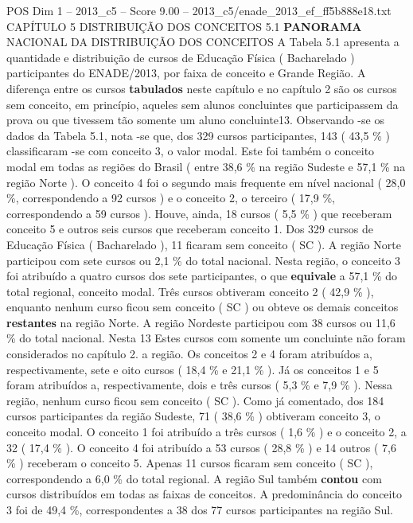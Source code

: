 \begin{textsample}{POS Dim 1 – 2013\_c5 – Score 9.00 – 2013\_c5/enade\_2013\_ef\_ff5b888e18.txt}  \label{ex:f1_pos_085}
CAPÍTULO 5 DISTRIBUIÇÃO DOS CONCEITOS 5.1 \textbf{PANORAMA} NACIONAL DA DISTRIBUIÇÃO DOS CONCEITOS A Tabela 5.1 apresenta a quantidade e distribuição de cursos de Educação Física ( Bacharelado ) participantes do ENADE/2013, por faixa de conceito e Grande Região.
A diferença entre os cursos \textbf{tabulados} neste capítulo e no capítulo 2 são os cursos sem conceito, em princípio, aqueles sem alunos concluintes que participassem da prova ou que tivessem tão somente um aluno concluinte13.
Observando -se os dados da Tabela 5.1, nota -se que, dos 329 cursos participantes, 143 ( 43,5 \% ) classificaram -se com conceito 3, o valor modal.
Este foi também o conceito modal em todas as regiões do Brasil ( entre 38,6 \% na região Sudeste e 57,1 \% na região Norte ).
O conceito 4 foi o segundo mais frequente em nível nacional ( 28,0 \%, correspondendo a 92 cursos ) e o conceito 2, o terceiro ( 17,9 \%, correspondendo a 59 cursos ).
Houve, ainda, 18 cursos ( 5,5 \% ) que receberam conceito 5 e outros seis cursos que receberam conceito 1.
Dos 329 cursos de Educação Física ( Bacharelado ), 11 ficaram sem conceito ( SC ).
A região Norte participou com sete cursos ou 2,1 \% do total nacional.
Nesta região, o conceito 3 foi atribuído a quatro cursos dos sete participantes, o que \textbf{equivale} a 57,1 \% do total regional, conceito modal.
Três cursos obtiveram conceito 2 ( 42,9 \% ), enquanto nenhum curso ficou sem conceito ( SC ) ou obteve os demais conceitos \textbf{restantes} na região Norte.
A região Nordeste participou com 38 cursos ou 11,6 \% do total nacional.
Nesta 13 Estes cursos com somente um concluinte não foram considerados no capítulo 2. a região.
Os conceitos 2 e 4 foram atribuídos a, respectivamente, sete e oito cursos ( 18,4 \% e 21,1 \% ).
Já os conceitos 1 e 5 foram atribuídos a, respectivamente, dois e três cursos ( 5,3 \% e 7,9 \% ).
Nessa região, nenhum curso ficou sem conceito ( SC ).
Como já comentado, dos 184 cursos participantes da região Sudeste, 71 ( 38,6 \% ) obtiveram conceito 3, o conceito modal.
O conceito 1 foi atribuído a três cursos ( 1,6 \% ) e o conceito 2, a 32 ( 17,4 \% ).
O conceito 4 foi atribuído a 53 cursos ( 28,8 \% ) e 14 outros ( 7,6 \% ) receberam o conceito 5.
Apenas 11 cursos ficaram sem conceito ( SC ), correspondendo a 6,0 \% do total regional.
A região Sul também \textbf{contou} com cursos distribuídos em todas as faixas de conceitos.
A predominância do conceito 3 foi de 49,4 \%, correspondentes a 38 dos 77 cursos participantes na região Sul.

\end{textsample}

